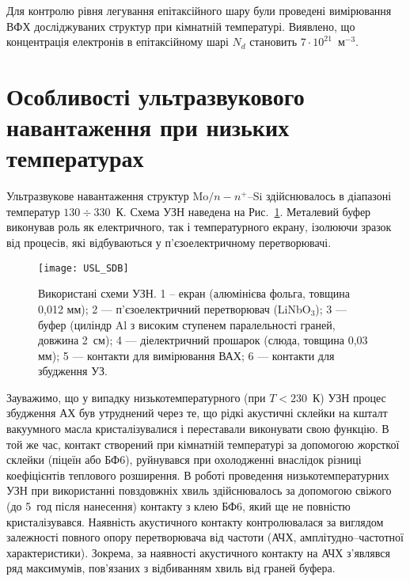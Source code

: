 \documentclass[a4paper,14pt,oneside,openany]{memoir}
\begin{document}
Для контролю рівня легування епітаксійного шару були проведені
вимірювання ВФХ досліджуваних структур при кімнатній температурі.
Виявлено, що концентрація електронів в епітаксійному шарі $N_d$ становить $7\cdot10^{21}$~м$^{-3}$.



\section{Особливості ультразвукового навантаження при низьких температурах\label{SSDB:USL}}

Ультразвукове навантаження структур Mo$/n-n^+$--Si здійснювалось в діапазоні температур $130\div330$~К.
Схема УЗН наведена на Рис.~\ref{figUSL:SDB}.
Металевий буфер виконував роль як електричного, так і температурного екрану, ізолюючи зразок від процесів, які відбуваються у
п'єзоелектричному перетворювачі.


\begin{figure}[b]
\center
\texttt{[image: USL\_SDB]}%
\caption{\label{figUSL:SDB}
Використані схеми УЗН.
1 --  екран (алюмінієва фольга, товщина 0,012 мм);
2 --- п'єзоелектричний перетворювач (LiNbO$_3$);
3 --- буфер (циліндр Al з високим ступенем паралельності граней, довжина 2~см);
4 --- діелектричний прошарок (слюда, товщина 0,03 мм);
5 --- контакти для вимірювання ВАХ;
6 --- контакти для збудження УЗ.
}
\end{figure}


Зауважимо, що у випадку низькотемпературного (при $T<230$~К) УЗН процес збудження АХ був утруднений через те, що
рідкі акустичні склейки на кшталт вакуумного масла кристалізувалися і переставали виконувати свою функцію.
В той же час, контакт створений при кімнатній температурі за допомогою жорсткої склейки (піцеїн або БФ6),
руйнувався при охолодженні внаслідок різниці коефіцієнтів теплового розширення.
В роботі проведення низькотемпературних УЗН при використанні повздовжніх хвиль здійснювалось за допомогою свіжого (до 5~год після нанесення) контакту з клею БФ6,
який ще не повністю кристалізувався.
Наявність акустичного контакту контролювалася за виглядом залежності повного опору перетворювача від частоти (АЧХ, амплітудно--частотної характеристики).
Зокрема, за наявності акустичного контакту на АЧХ з'являвся ряд максимумів, пов'язаних з відбиванням хвиль від граней буфера.
\end{document}
